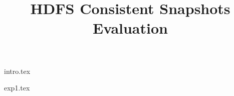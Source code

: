 \documentclass[10pt,preprint]{sigplanconf}
\date{}
\begin{document}
\title{HDFS Consistent Snapshots Evaluation}


\maketitle

 {intro.tex}

 {exp1.tex}



% 

% 

%

% 

% 

% 

% 

\nocite{chandy}
\clearpage




\end{document}
